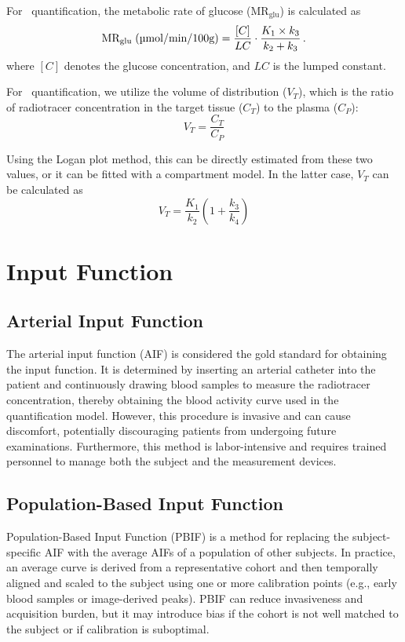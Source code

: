 For \fdg$\,$ quantification, the metabolic rate of glucose (\(\textrm{MR}_{\textrm{glu}}\)) is calculated as
\begin{equation}
	\textrm{MR}_{\textrm{glu}} \; (\textrm{\textmu mol/min/100g}) = \frac{[C]}{LC} \cdot \frac{K_1 \times k_3}{k_2 + k_3} \,.
\end{equation}
where \([C]\) denotes the glucose concentration, and \(LC\) is the lumped constant.

For \yohimbine\ quantification, we utilize the volume of distribution ($V_T$), which is the ratio of radiotracer concentration in the target tissue ($C_T$) to the plasma ($C_P$): %
\[
	V_T = \frac{C_T}{C_P}
\]

Using the Logan plot method, this can be directly estimated from these two values, or it can be fitted with a compartment model. %
In the latter case, $V_T$ can be calculated as
\[
	V_T = \frac{K_1}{k_2} (1+\frac{k_3}{k_4})
\]

\section{Input Function}

\subsection{Arterial Input Function}
The arterial input function (AIF) is considered the gold standard for obtaining the input function.
It is determined by inserting an arterial catheter into the patient and continuously drawing blood samples to measure the radiotracer concentration, thereby obtaining the blood activity curve used in the quantification model.
However, this procedure is invasive and can cause discomfort, potentially discouraging patients from undergoing future examinations.
Furthermore, this method is labor-intensive and requires trained personnel to manage both the subject and the measurement devices.

\subsection{Population-Based Input Function}
Population-Based Input Function (PBIF) is a method for replacing the subject-specific AIF with the average AIFs of a population of other subjects. %
In practice, an average curve is derived from a representative cohort and then temporally aligned and scaled to the subject using one or more calibration points (e.g., early blood samples or image-derived peaks).
PBIF can reduce invasiveness and acquisition burden, but it may introduce bias if the cohort is not well matched to the subject or if calibration is suboptimal.

